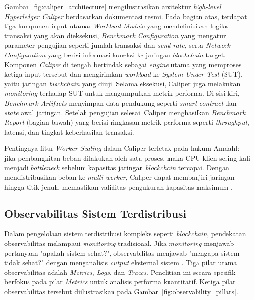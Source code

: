 Gambar~\ref{fig:caliper_architecture} mengilustrasikan arsitektur \textit{high-level Hyperledger Caliper} berdasarkan dokumentasi resmi. Pada bagian atas, terdapat tiga komponen input utama: \textit{Workload Module} yang mendefinisikan logika transaksi yang akan dieksekusi, \textit{Benchmark Configuration} yang mengatur parameter pengujian seperti jumlah transaksi dan \textit{send rate}, serta \textit{Network Configuration} yang berisi informasi koneksi ke jaringan \textit{blockchain} target. Komponen \textit{Caliper} di tengah bertindak sebagai \textit{engine} utama yang memproses ketiga input tersebut dan mengirimkan \textit{workload} ke \textit{System Under Test} (SUT), yaitu jaringan \textit{blockchain} yang diuji. Selama eksekusi, Caliper juga melakukan \textit{monitoring} terhadap SUT untuk mengumpulkan metrik performa. Di sisi kiri, \textit{Benchmark Artifacts} menyimpan data pendukung seperti \textit{smart contract} dan \textit{state} awal jaringan. Setelah pengujian selesai, Caliper menghasilkan \textit{Benchmark Report} (bagian bawah) yang berisi ringkasan metrik performa seperti \textit{throughput}, latensi, dan tingkat keberhasilan transaksi.

Pentingnya fitur \textit{Worker Scaling} dalam Caliper terletak pada hukum Amdahl: jika pembangkitan beban dilakukan oleh satu proses, maka CPU klien sering kali menjadi \textit{bottleneck} sebelum kapasitas jaringan \textit{blockchain} tercapai. Dengan mendistribusikan beban ke \textit{multi-worker}, Caliper dapat membanjiri jaringan hingga titik jenuh, memastikan validitas pengukuran kapasitas maksimum \cite{hyperledger_caliper, nasir2022}.

\subsection{Observabilitas Sistem Terdistribusi}

Dalam pengelolaan sistem terdistribusi kompleks seperti \textit{blockchain}, pendekatan observabilitas melampaui \textit{monitoring} tradisional. Jika \textit{monitoring} menjawab pertanyaan "apakah sistem sehat?", observabilitas menjawab "mengapa sistem tidak sehat?" dengan menganalisis \textit{output} eksternal sistem \cite{picco2021}. Tiga pilar utama observabilitas adalah \textit{Metrics}, \textit{Logs}, dan \textit{Traces}. Penelitian ini secara spesifik berfokus pada pilar \textit{Metrics} untuk analisis performa kuantitatif. Ketiga pilar observabilitas tersebut diilustrasikan pada Gambar~\ref{fig:observability_pillars}.

